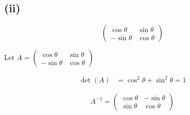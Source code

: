\subsection*{(ii)}
\[
	\begin{pmatrix}
		\cos\theta  & \sin\theta \\
		-\sin\theta & \cos\theta
	\end{pmatrix}
\]

Let $A = \begin{pmatrix}
		\cos\theta  & \sin\theta \\
		-\sin\theta & \cos\theta
	\end{pmatrix}$

\begin{align}
	\det(A) & = \cos^2\theta + \sin^2\theta = 1
\end{align}

\[
	A^{-1} = \begin{pmatrix}
		\cos\theta & -\sin\theta \\
		\sin\theta & \cos\theta
	\end{pmatrix}
\]